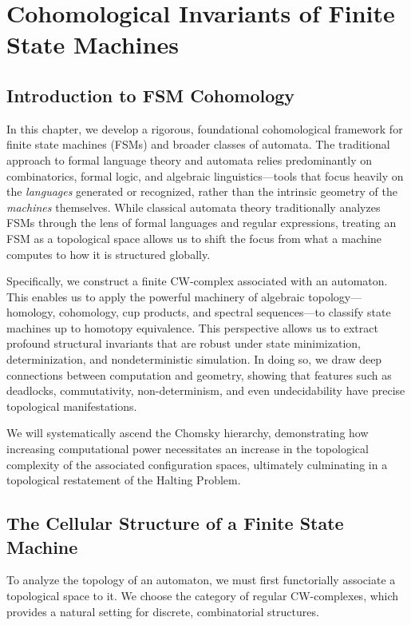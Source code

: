\chapter{Cohomological Invariants of Finite State Machines}
\label{ch:fsm_cohomology}

\section{Introduction to FSM Cohomology}

In this chapter, we develop a rigorous, foundational cohomological framework for finite state machines (FSMs) and broader classes of automata. The traditional approach to formal language theory and automata relies predominantly on combinatorics, formal logic, and algebraic linguistics—tools that focus heavily on the \emph{languages} generated or recognized, rather than the intrinsic geometry of the \emph{machines} themselves. While classical automata theory traditionally analyzes FSMs through the lens of formal languages and regular expressions, treating an FSM as a topological space allows us to shift the focus from what a machine computes to how it is structured globally.

Specifically, we construct a finite CW-complex associated with an automaton. This enables us to apply the powerful machinery of algebraic topology—homology, cohomology, cup products, and spectral sequences—to classify state machines up to homotopy equivalence. This perspective allows us to extract profound structural invariants that are robust under state minimization, determinization, and nondeterministic simulation. In doing so, we draw deep connections between computation and geometry, showing that features such as deadlocks, commutativity, non-determinism, and even undecidability have precise topological manifestations.

We will systematically ascend the Chomsky hierarchy, demonstrating how increasing computational power necessitates an increase in the topological complexity of the associated configuration spaces, ultimately culminating in a topological restatement of the Halting Problem.

\section{The Cellular Structure of a Finite State Machine}

To analyze the topology of an automaton, we must first functorially associate a topological space to it. We choose the category of regular CW-complexes, which provides a natural setting for discrete, combinatorial structures.

